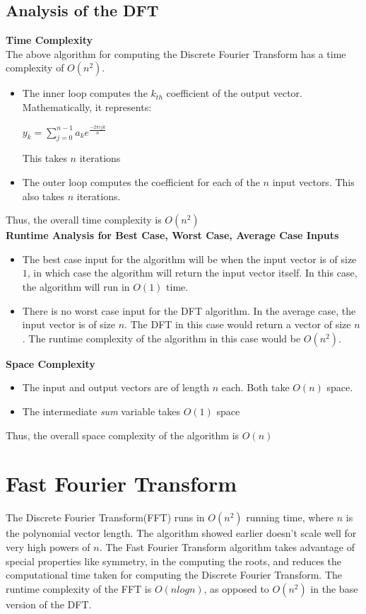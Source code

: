 \documentclass{article}
\begin{document}
\subsection{Analysis of the DFT}
\textbf{Time Complexity} \\
The above algorithm for computing the Discrete Fourier Transform has a time complexity of $O(n^{2})$. 
\begin{itemize}
\item The inner loop computes the $k_{th}$ coefficient of the output vector. Mathematically, it represents:
\begin{center}
$y_{k}=\sum_{j=0}^{n-1}a_{k}e^{\frac{-2\pi ijk}{n}}$
\end{center}
This takes $n$ iterations
\item
The outer loop computes the coefficient for each of the $n$ input vectors. This also takes $n$ iterations.
\end{itemize}

Thus, the overall time complexity is $O(n^{2})$ \\

\textbf{Runtime Analysis for Best Case, Worst Case, Average Case Inputs}
\begin{itemize}
\item
The best case input for the algorithm will be when the input vector is of size $1$, in which case the algorithm will return the input vector itself. In this case, the algorithm will run in $O(1)$ time.
\item
There is no worst case input for the DFT algorithm. In the average case, the input vector is of size $n$. The DFT in this case would return a vector of size $n$. The runtime complexity of the algorithm in this case would be $O(n^{2})$.
\end{itemize}

\textbf{Space Complexity}
\begin{itemize}
\item The input and output vectors are of length $n$ each. Both take $O(n)$ space.
\item The intermediate \textit{sum} variable takes $O(1)$ space
\end{itemize}
Thus, the overall space complexity of the algorithm is $O(n)$


\section{Fast Fourier Transform} \cite{fft}
The Discrete Fourier Transform(FFT) runs in $O(n^{2})$ running time, where $n$ is the polynomial vector length. The algorithm showed earlier doesn't scale well for very high powers of $n$. The Fast Fourier Transform algorithm takes advantage of special properties like symmetry, in the computing the roots, and reduces the computational time taken for computing the Discrete Fourier Transform. The runtime complexity of the FFT is $O(nlog{n})$, as opposed to $O(n^{2})$ in the base version of the DFT. \\
\end{document}
